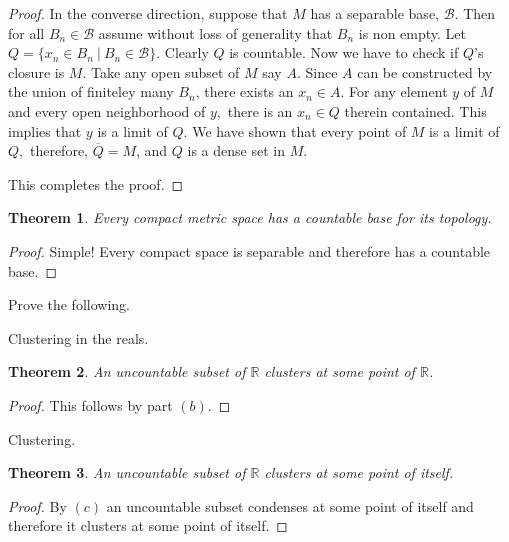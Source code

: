 \documentclass[letter]{article}
\newtheorem{theorem}{Theorem}
\newenvironment{menumerate}{%
  \edef\backupindent{\the\parindent}%
  \enumerate%
  \setlength{\parindent}{\backupindent}%
}{\endenumerate}
\begin{document}
\begin{menumerate}
\begin{proof}
				In the converse direction, suppose that $M$ has a separable base, $\mathcal{B}.$ Then for all $B_n \in \mathcal{B}$ assume without loss of generality that $B_n$ is non empty. Let $Q = \{x_n \in B_n \ |\ B_n \in \mathcal{B}\}$. Clearly $Q$ is countable. Now we have to check if $Q$'s closure is $M.$ Take any open subset of $M$ say $A$. Since $A$ can be constructed by the union of finiteley many $B_n$, there exists an $x_n \in A.$ For any element $y$ of $M$ and every open neighborhood of $y,$ there is an $x_n \in Q$ therein contained. This implies that $y$ is a limit of $Q.$ We have shown that every point of $M$ is a limit of $Q,$ therefore, $\overline{Q} = M$, and $Q$ is a dense set in $M.$ 

				This completes the proof.  
			
		\end{proof}
		\begin{theorem}
		Every compact metric space has a countable base for its topology.
		\end{theorem}
		\begin{proof}
			Simple! Every compact space is separable and therefore has a countable base.
		\end{proof}


	\setcounter{enumi}{132}
	\item Prove the following.
	\begin{menumerate}
		\item Clustering in the reals.
		\begin{theorem}
			An uncountable subset of $\mathbb{R}$ clusters at some point of $\mathbb{R}$.
		\end{theorem}
		\begin{proof}
		 This follows by part $(b).$
		\end{proof}

		\item Clustering.
		\begin{theorem}
			An uncountable subset of $\mathbb{R}$ clusters at some point of itself.
		\end{theorem}
			\begin{proof}
			By $(c)$ an uncountable subset condenses at some point of itself and therefore it clusters at some point of itself.
			\end{proof}


\end{menumerate}
\end{menumerate}
\end{document}
